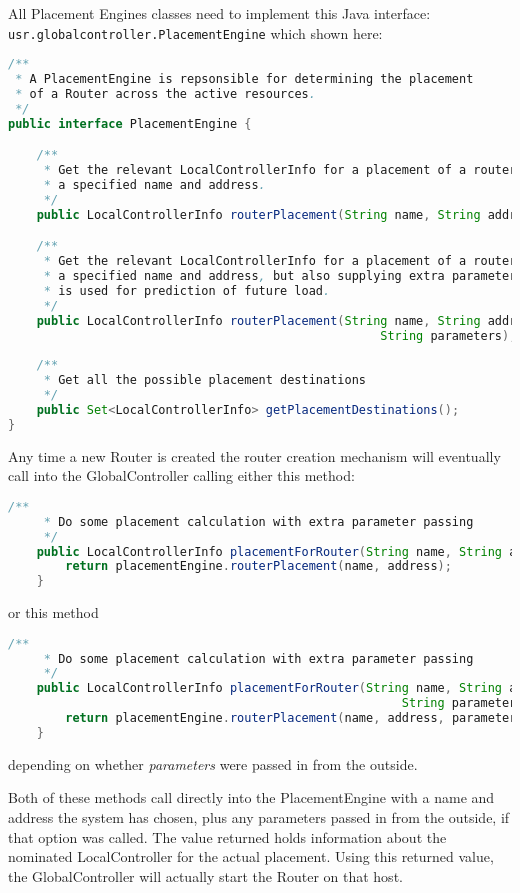 \begin{sloppypar}
\noindent  All Placement Engines classes need to implement this Java interface:
\texttt{usr.globalcontroller.PlacementEngine} which shown here:
\end{sloppypar}


\begin{lstlisting}[language=Java,frame=single]
  /**
 * A PlacementEngine is repsonsible for determining the placement
 * of a Router across the active resources.
 */
public interface PlacementEngine {

    /**
     * Get the relevant LocalControllerInfo for a placement of a router with 
     * a specified name and address.
     */
    public LocalControllerInfo routerPlacement(String name, String address);

    /**
     * Get the relevant LocalControllerInfo for a placement of a router with 
     * a specified name and address, but also supplying extra parameters. It 
     * is used for prediction of future load.
     */
    public LocalControllerInfo routerPlacement(String name, String address,
                                                    String parameters);
    
    /**
     * Get all the possible placement destinations
     */
    public Set<LocalControllerInfo> getPlacementDestinations();
}
\end{lstlisting}


\noindent  Any time a new Router is created the router creation
mechanism will  eventually call into the GlobalController calling either this method:

\begin{lstlisting}[language=Java]
    /**
     * Do some placement calculation with extra parameter passing
     */
    public LocalControllerInfo placementForRouter(String name, String address) {
        return placementEngine.routerPlacement(name, address);
    }
\end{lstlisting}

\noindent or this method

\begin{lstlisting}[language=Java]
    /**
     * Do some placement calculation with extra parameter passing
     */
    public LocalControllerInfo placementForRouter(String name, String address,
                                                       String parameters) {
        return placementEngine.routerPlacement(name, address, parameters);
    }
\end{lstlisting}

\noindent depending on whether \emph{parameters} were passed in from
the outside.

Both of these methods  call directly into the PlacementEngine with a
name and address the system has chosen,  plus any parameters passed in
from the outside, if that option was called.
The value returned holds information about the nominated
LocalController for the actual placement.
Using this returned value, the GlobalController will actually start
the Router on that host. 



